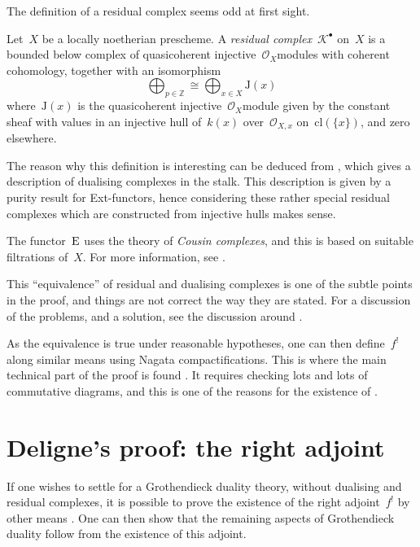 \documentclass[10pt,a4paper]{article}
\begin{document}
The definition of a residual complex seems odd at first sight.
\begin{definition}
  Let~$X$ be a locally noetherian prescheme. A \emph{residual complex}~$\mathcal{K}^\bullet$ on~$X$ is a bounded below complex of quasicoherent injective~$\mathcal{O}_X$\dash modules with coherent cohomology, together with an isomorphism
  \begin{equation}
    \bigoplus_{p\in\mathbb{Z}}\cong\bigoplus_{x\in X}\mathrm{J}(x)
  \end{equation}
  where~$\mathrm{J}(x)$ is the quasicoherent injective~$\mathcal{O}_X$\dash module given by the constant sheaf with values in an injective hull of~$k(x)$ over~$\mathcal{O}_{X,x}$ on~$\mathrm{cl}(\{x\})$, and zero elsewhere.
\end{definition}
The reason why this definition is interesting can be deduced from \cite[proposition V.3.4]{hartshorne-residues-and-duality}, which gives a description of dualising complexes in the stalk. This description is given by a purity result for Ext-functors, hence considering these rather special residual complexes which are constructed from injective hulls makes sense.

The functor~$\operatorname{E}$ uses the theory of \emph{Cousin complexes}, and this is based on suitable filtrations of~$X$. For more information, see \cite[chapter IV]{hartshorne-residues-and-duality}.

This ``equivalence'' of residual and dualising complexes is one of the subtle points in the proof, and things are not correct the way they are stated. For a discussion of the problems, and a solution, see the discussion around \cite[lemma 3.2.1]{conrad-grothendieck-duality-and-base-change}.

As the equivalence is true under reasonable hypotheses, one can then define~$f^!$ along similar means using Nagata compactifications. This is where the main technical part of the proof is found \cite[\S VI.2--VI.5]{hartshorne-residues-and-duality}. It requires checking lots and lots of commutative diagrams, and this is one of the reasons for the existence of \cite{conrad-grothendieck-duality-and-base-change}.


\section{Deligne's proof: the right adjoint}
If one wishes to settle for a Grothendieck duality theory, without dualising and residual complexes, it is possible to prove the existence of the right adjoint~$f^!$ by other means \cite{deligne-appendix,verdier-twisted-inverse-image-functor}. One can then show that the remaining aspects of Grothendieck duality follow from the existence of this adjoint.
\end{document}

